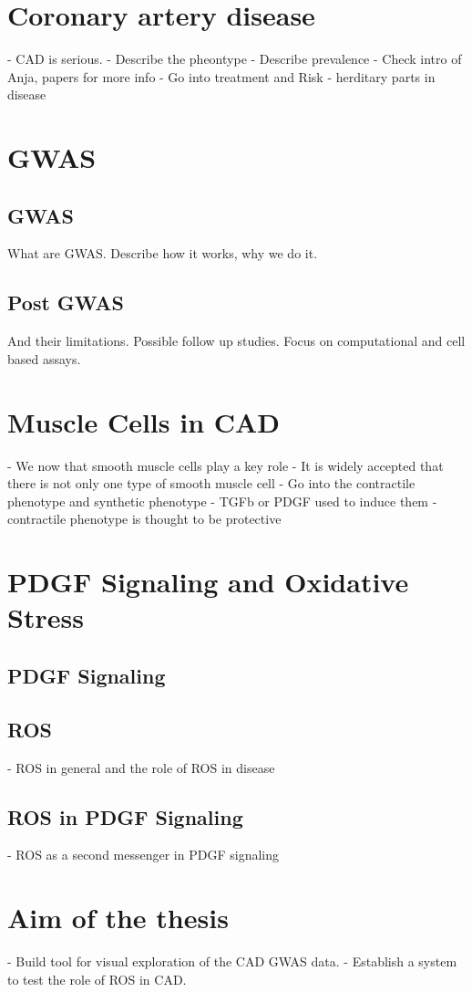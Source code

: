 \section{Coronary artery disease}
\label{sec:cad}
- CAD is serious.
- Describe the pheontype
- Describe prevalence
- Check intro of Anja, papers for more info
- Go into treatment and Risk
- herditary parts in disease

\section{GWAS}
\label{sec:gwas}

    \subsection{GWAS}
    \label{subsec:gwas_general}
    What are GWAS. Describe how it works, why we do it.

    \subsection{Post GWAS}
    \label{subsec:gwas_limit}
    And their limitations. Possible follow up studies. Focus on computational and cell based assays.

\section{Muscle Cells in CAD}
\label{sec:haosms}
- We now that smooth muscle cells play a key role
- It is widely accepted that there is not only one type of smooth muscle cell
- Go into the contractile phenotype and synthetic phenotype
    - TGFb or PDGF used to induce them
    - contractile phenotype is thought to be protective

\section{PDGF Signaling and Oxidative Stress}
\label{sec:haosms}
    \subsection{PDGF Signaling}
    \label{subsec:pdf_signaling}

    \subsection{ROS}
    \label{subsec:ROS}
    - ROS in general and the role of ROS in disease

    \subsection{ROS in PDGF Signaling}
    \label{subsec:ROS_signaling}
    - ROS as a second messenger in PDGF signaling

\section{Aim of the thesis}
\label{sec:Aim}
- Build tool for visual exploration of the CAD GWAS data.
- Establish a system to test the role of ROS in CAD.
